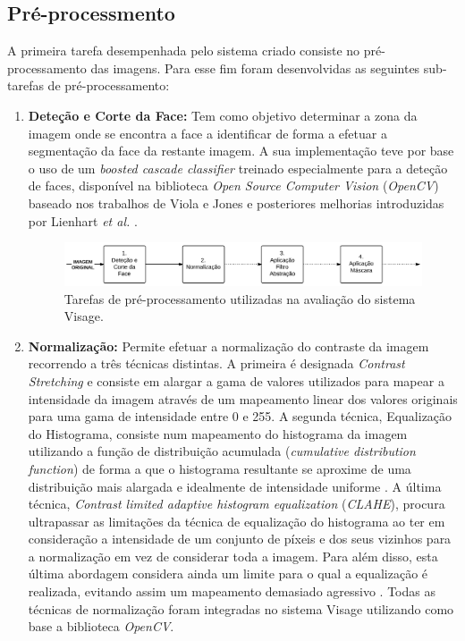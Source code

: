 \documentclass{llncs}
\begin{document}
\subsection{Pré-processmento}\label{sec:pre-processamento}

A primeira tarefa desempenhada pelo sistema criado consiste no pré-processamento das imagens. Para esse fim foram desenvolvidas as seguintes sub-tarefas de pré-processamento:
\begin{enumerate}
\item \textbf{Deteção e Corte da Face:} Tem como objetivo determinar a zona da imagem onde se encontra a face a identificar de forma a efetuar a segmentação da face da restante imagem. A sua implementação teve por base o uso de um \textit{boosted cascade classifier} treinado especialmente para a deteção de faces, disponível na biblioteca \textit{Open Source Computer Vision} (\textit{OpenCV}) baseado nos trabalhos de Viola e Jones \cite{Viola2001} e posteriores melhorias introduzidas por Lienhart \textit{et al.} \cite{Lienhart2003}.

\begin{figure}[t]
  \centering
    \leavevmode
    \includegraphics[width=1\textwidth]{PreProcessamentoVisage}
    \caption{Tarefas de pré-processamento utilizadas na avaliação do sistema Visage.}
    \label{fig:preprocessamento}
\end{figure}

\item \textbf{Normalização:} Permite efetuar a normalização do contraste da imagem recorrendo a três técnicas distintas. A primeira é designada \textit{Contrast Stretching} e consiste em alargar a gama de valores utilizados para mapear a intensidade da imagem através de um mapeamento linear dos valores originais para uma gama de intensidade entre 0 e 255. A segunda técnica, Equalização do Histograma, consiste num mapeamento do histograma da imagem utilizando a função de distribuição acumulada (\textit{cumulative distribution function}) de forma a que o histograma resultante se aproxime de uma distribuição mais alargada e idealmente de intensidade uniforme \cite{Bradski2008}. A última técnica, \textit{Contrast limited adaptive histogram equalization} (\textit{CLAHE}), procura ultrapassar as limitações da técnica de equalização do histograma ao ter em consideração a intensidade de um conjunto de píxeis e dos seus vizinhos para a normalização em vez de considerar toda a imagem. Para além disso, esta última abordagem considera ainda um limite para o qual a equalização é realizada, evitando assim  um mapeamento demasiado agressivo \cite{Reza2004}. Todas as técnicas de normalização foram integradas no sistema Visage utilizando como base a biblioteca \textit{OpenCV}.


\end{enumerate}
\end{document}
